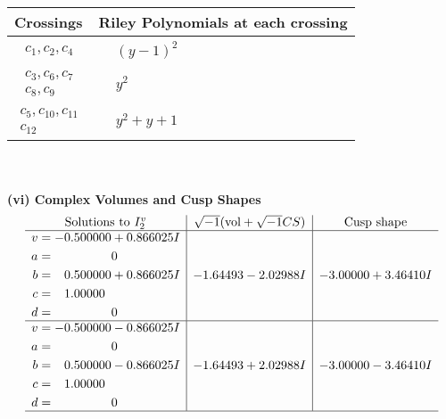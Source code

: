 \documentclass[1p]{elsarticle_modified}
\theoremstyle{definition}
\newcommand{\I}{\sqrt{-1}}
\begin{document}
\begin{tabular}{m{50pt}|m{274pt}}
Crossings & \hspace{64pt}Riley Polynomials at each crossing \\
\hline $$\begin{aligned}c_{1},c_{2},c_{4}\end{aligned}$$&$\begin{aligned}
&(y-1)^2
\end{aligned}$\\
\hline $$\begin{aligned}c_{3},c_{6},c_{7}\\c_{8},c_{9}\end{aligned}$$&$\begin{aligned}
&y^2
\end{aligned}$\\
\hline $$\begin{aligned}c_{5},c_{10},c_{11}\\c_{12}\end{aligned}$$&$\begin{aligned}
&y^2+y+1
\end{aligned}$\\
\hline
\end{tabular}\\~\\
\newpage\flushleft \textbf{(vi) Complex Volumes and Cusp Shapes}
$$\begin{array}{c|c|c}  
\text{Solutions to }I^v_{2}& \I (\text{vol} + \sqrt{-1}CS) & \text{Cusp shape}\\
 \hline 
\begin{aligned}
v &= -0.500000 + 0.866025 I \\
a &= \phantom{-0.000000 } 0 \\
b &= \phantom{-}0.500000 + 0.866025 I \\
c &= \phantom{-}1.00000\phantom{ +0.000000I} \\
d &= \phantom{-0.000000 } 0\end{aligned}
 & -1.64493 - 2.02988 I & -3.00000 + 3.46410 I \\ \hline\begin{aligned}
v &= -0.500000 - 0.866025 I \\
a &= \phantom{-0.000000 } 0 \\
b &= \phantom{-}0.500000 - 0.866025 I \\
c &= \phantom{-}1.00000\phantom{ +0.000000I} \\
d &= \phantom{-0.000000 } 0\end{aligned}
 & -1.64493 + 2.02988 I & -3.00000 - 3.46410 I\\
 \hline 
 \end{array}$$\newpage\newpage\renewcommand{\arraystretch}{1}
\end{document}
